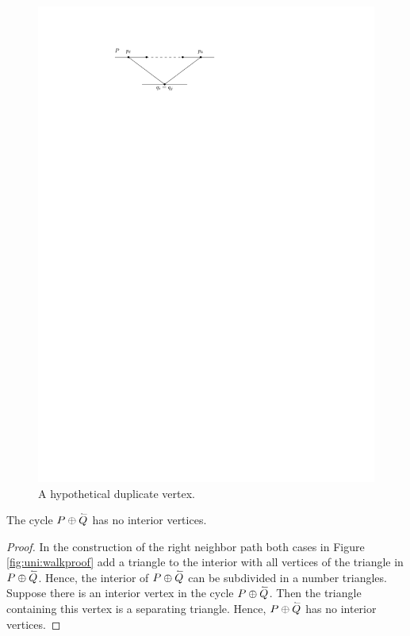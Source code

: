     \begin{figure}[b]
      \centering
      \includegraphics[scale=1]{unifiedAlgo/img/rightNeighbourwalk/neighborPathisPath.pdf}
      \caption{A hypothetical duplicate vertex.}
      \label{fig:right:path}
    \end{figure}

    \begin{lemma}
      \label{lm:right:neighbourwalkNoInteriorVertex}
      The cycle $P \oplus \accentset{\leftharpoonup}{Q}$ has no interior vertices.
    \end{lemma}
    \begin{proof}
      In the construction of the right neighbor path both cases in Figure \ref{fig:uni:walkproof} add a triangle to the interior with all vertices of the triangle in $P \oplus \accentset{\leftharpoonup}{Q}$. Hence, the interior of $P \oplus \accentset{\leftharpoonup}{Q}$ can be subdivided in a number triangles.
      Suppose there is an interior vertex in the cycle $P \oplus \accentset{\leftharpoonup}{Q}$. Then the triangle containing this vertex is a separating triangle. Hence, $P \oplus \accentset{\leftharpoonup}{Q}$ has no interior vertices.
    \end{proof}

